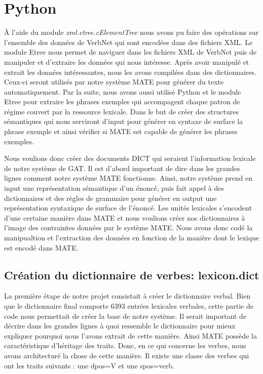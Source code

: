 
\section{Python}

À l'aide du module \emph{xml.etree.cElementTree} nous avons pu faire des opérations sur l'ensemble des données de VerbNet qui sont encodées dans des fichiers XML. Le module Etree nous permet de naviguer dans les fichiers XML de VerbNet puis de manipuler et d'extraire les données qui nous intéresse. Après avoir manipulé et extrait les données intéressantes, nous les avons compilées dans des dictionnaires. Ceux-ci seront utilisés par notre système MATE pour générer du texte automatiquement. Par la suite, nous avons aussi utilisé Python et le module Etree pour extraire les phrases exemples qui accompagent chaque patron de régime couvert par la ressource lexicale. Dans le but de créer des structures sémantiques qui nous serviront d'input pour générer en syntaxe de surface la phrase exemple et ainsi vérifier si MATE est capable de générer les phrases exemples.

Nous voulions donc créer des documents DICT qui seraient l'information lexicale de notre système de GAT. Il est d'abord important de dire dans les grandes lignes comment notre système MATE fonctionne. Ainsi, notre système prend en input une représentation sémantique d'un énoncé, puis fait appel à des dictionnaires et des règles de grammaire pour générer en output une représentation syntaxique de surface de l'énoncé. Les unités lexicales s'encodent d'une certaine manière dans MATE et nous voulions créer nos dictionnaires à l'image des contraintes données par le système MATE. Nous avons donc codé la manipualtion et l'extraction des données en fonction de la manière dont le lexique est encodé dans MATE.

\subsection{Création du dictionnaire de verbes: lexicon.dict}

La première étape de notre projet consistait à créer le dictionnaire verbal. Bien que le dictionnaire final comporte 6393 entrées lexicales verbales, cette partie de code nous permettait de créer la base de notre système. Il serait important de décrire dans les grandes lignes à quoi ressemble le dictionnaire pour mieux expliquer pourquoi nous l'avons extrait de cette manière. Ainsi MATE possède la caractéristique d'héritage des traits. Donc, en ce qui concerne les verbes, nous avons architecturé la chose de cette manière. Il existe une classe des verbes qui ont les traits suivants : une dpos=V et une spos=verb.

